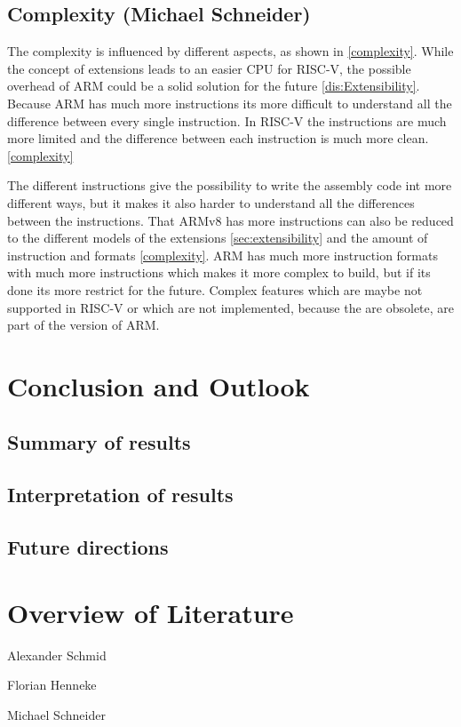 \documentclass[conference]{IEEEtran}
\begin{document}
	\subsection{Complexity (Michael Schneider)}
The complexity is influenced by different aspects, as shown in \ref{complexity}.
While the concept of extensions leads to an easier CPU for RISC-V, the possible overhead of ARM could be a solid solution for the future \ref{dis:Extensibility}.
	Because ARM has much more instructions its more difficult to understand all the difference between every single instruction. In RISC-V the instructions are much more limited and the difference between each instruction is much more clean. \ref{complexity}
	
	The different instructions give the possibility to write the assembly code int more different ways, but it makes it also harder to understand all the differences between the instructions. That ARMv8 has more instructions can also be reduced to the different models of the extensions \ref{sec:extensibility} and the amount of instruction and formats \ref{complexity}.
ARM has much more instruction formats with much more instructions which makes it more complex to build, but if its done its more restrict for the future. Complex features which are maybe not supported in RISC-V or which are not implemented, because the are obsolete, are part of the version of ARM. \cite{Waterman2017} \cite{Arm2020}

\section{Conclusion and Outlook}
\label{ref:conclusion}
	\subsection{Summary of results}
	\subsection{Interpretation of results}
	\subsection{Future directions}


\section{Overview of Literature}
Alexander Schmid \cite{Akram2017} \cite{Arm2020} \cite{Asanovic2014} \cite{HeuiLee2001} \cite{Patterson2019} \cite{Perotti2020} \cite{Shore2015} \cite{Waterman2016} \cite{Xu2003}

Florian Henneke \cite{Waterman2016} \cite{Ryzhyk2006} \cite{Asanovic2014} \cite{Furber2000} \cite{Microsoft2020} \cite{Greenwaves2020} \cite{Aws2020} \cite{Microsoft2020}

Michael Schneider \cite{Waterman2017} \cite{Arm2020} \cite{George1990} \cite{Waterman2016} \cite{50years} \cite{hennessy2012computer} \cite{drechsler2020enhanced} \cite{WisconsinMadison2016} \cite{IEEE2018} \cite{Dirvin2019} \cite{Bandic2019} \cite{Berkeley2019}



\end{document}
